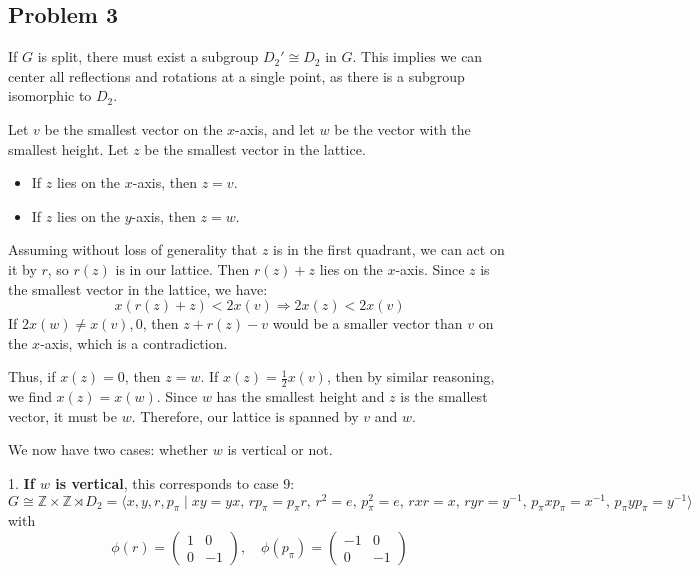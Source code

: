 \documentclass[12pt, letterpaper]{article}
\theoremstyle{definition}
\begin{document}
\newpage
\subsection*{Problem 3}
\hspace{0.48cm} If \( G \) is split, there must exist a subgroup \( D_2' \cong D_2 \) in \( G \). This implies we can center all reflections and rotations at a single point, as there is a subgroup isomorphic to \( D_2 \).

Let \( v \) be the smallest vector on the \( x \)-axis, and let \( w \) be the vector with the smallest height. Let \( z \) be the smallest vector in the lattice.

\begin{itemize}
    \item If \( z \) lies on the \( x \)-axis, then \( z = v \).
    \item If \( z \) lies on the \( y \)-axis, then \( z = w \).
\end{itemize}

Assuming without loss of generality that \( z \) is in the first quadrant, we can act on it by \( r \), so \( r(z) \) is in our lattice. Then \( r(z) + z \) lies on the \( x \)-axis. Since \( z \) is the smallest vector in the lattice, we have:
\[
x(r(z) + z) < 2x(v) \Rightarrow 2x(z) < 2x(v)
\]
If \( 2x(w) \neq x(v), 0 \), then \( z + r(z) - v \) would be a smaller vector than \( v \) on the \( x \)-axis, which is a contradiction.

Thus, if \( x(z) = 0 \), then \( z = w \). If \( x(z) = \frac{1}{2}x(v) \), then by similar reasoning, we find \( x(z) = x(w) \). Since \( w \) has the smallest height and \( z \) is the smallest vector, it must be \( w \). Therefore, our lattice is spanned by \( v \) and \( w \).

We now have two cases: whether \( w \) is vertical or not.

1. \textbf{If \( w \) is vertical}, this corresponds to case 9:
   \[
   G \cong \mathbb{Z} \times \mathbb{Z} \rtimes D_2 = \langle x, y, r, p_\pi \mid xy = yx, \, rp_\pi = p_\pi r, \, r^2 = e, \, p_\pi^2 = e, \, r x r = x, \, r y r = y^{-1}, \, p_\pi x p_\pi = x^{-1}, \, p_\pi y p_\pi = y^{-1} \rangle
   \]
   with
   \[
   \phi(r) = \begin{pmatrix} 1 & 0 \\ 0 & -1 \end{pmatrix}, \quad \phi(p_\pi) = \begin{pmatrix} -1 & 0 \\ 0 & -1 \end{pmatrix}
   \]
\end{document}
